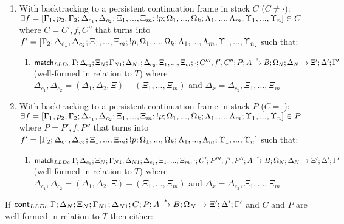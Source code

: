 \begin{lemma}
\begin{enumerate}
\begin{enumerate}
         \item With backtracking to a persistent continuation frame in stack $C$ ($C \neq \cdot$):\\
         $\exists f = [\Gamma_1, p_2, \Gamma_2; \Delta_{c_1}, \Delta_{c_2}; \Xi_1, ..., \Xi_m; {!} p; \Omega_1, ..., \Omega_k; \Lambda_1, ..., \Lambda_m; \Upsilon_1, ..., \Upsilon_n] \in C$ where $C = C', f, C''$ that turns into $f' = [\Gamma_2; \Delta_{c_1}, \Delta_{c_2}; \Xi_1, ..., \Xi_m; {!} p; \Omega_1, ..., \Omega_k; \Lambda_1, ..., \Lambda_m; \Upsilon_1, ..., \Upsilon_n]$ such that:
         \begin{enumerate}
            \item $\mathsf{match}_{LLDc} \; \Gamma; \Delta_{c_1}; \Xi_N; \Gamma_{N1}; \Delta_{N1}; \Delta_{c_2}, \Xi_1, ..., \Xi_m; \cdot; C''', f', C''; P; A \xrightarrow{*} B; \Omega_N; \Delta_N \rightarrow \Xi'; \Delta'; \Gamma'$ (well-formed in relation to $T$)
            where $\Delta_{c_1}, \Delta_{c_2} = (\Delta_1, \Delta_2, \Xi) - (\Xi_1, ..., \Xi_m)$ and $\Delta_x = \Delta_{c_2}, \Xi_1, ..., \Xi_m$
         \end{enumerate}
            
         \item With backtracking to a persistent continuation frame in stack $P$ ($C = \cdot$):\\
         $\exists f = [\Gamma_1, p_2, \Gamma_2; \Delta_{c_1}, \Delta_{c_2}; \Xi_1, ..., \Xi_m; {!} p; \Omega_1, ..., \Omega_k; \Lambda_1, ..., \Lambda_m; \Upsilon_1, ..., \Upsilon_n] \in P$ where $P = P', f, P''$ that turns into $f' = [\Gamma_2; \Delta_{c_1}, \Delta_{c_2}; \Xi_1, ..., \Xi_m; {!} p; \Omega_1, ..., \Omega_k; \Lambda_1, ..., \Lambda_m; \Upsilon_1, ..., \Upsilon_n]$ such that:
            \begin{enumerate}
               \item $\mathsf{match}_{LLDc} \; \Gamma; \Delta_{c_1}; \Xi_N; \Gamma_{N1}; \Delta_{N1}; \Delta_{c_2}, \Xi_1, ..., \Xi_m; \cdot; C'; P''', f', P''; A \xrightarrow{*} B; \Omega_N; \Delta_N \rightarrow \Xi'; \Delta'; \Gamma'$ (well-formed in relation to $T$) where $\Delta_{c_1}, \Delta_{c_2} = (\Delta_1, \Delta_2, \Xi) - (\Xi_1, ..., \Xi_m)$ and $\Delta_x = \Delta_{c_2}, \Xi_1, ..., \Xi_m$
            \end{enumerate}
      \end{enumerate}
   \end{enumerate}
   
If $\mathsf{cont}_{LLDc} \; \Gamma; \Delta_{N}; \Xi_{N}; \Gamma_{N1}; \Delta_{N1}; C; P; A \xrightarrow{*} B; \Omega_N \rightarrow \Xi'; \Delta'; \Gamma'$ and $C$ and $P$ are well-formed in relation to $T$ then either:


\end{lemma}
